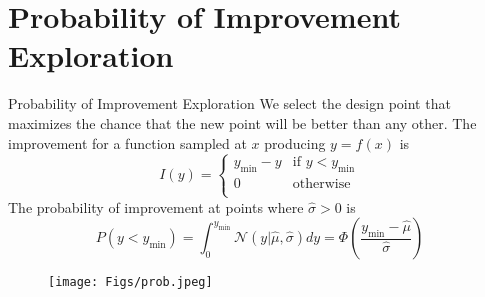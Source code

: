 \documentclass{beamer}
\begin{document}
\section{Probability of Improvement Exploration}
\begin{frame}{Probability of Improvement Exploration}
We select the design point that maximizes the chance that the new point will be better than any other. The improvement for a function sampled at $x$ producing $y=f(x)$ is
\begin{equation*}
    I(y) = 
    \begin{cases}
    y_{\min} - y & \textrm{if~} y<y_{\min}\\
    0 & {\textrm{otherwise}}\\
    \end{cases}
\end{equation*}
The probability of improvement at points where $\hat{\sigma}>0$ is
\begin{equation*}
P(y<y_{\min}) = \int_0^{y_{\min}} \mathcal{N}(y| \hat{\mu}, \hat{\sigma})dy = \Phi(\frac{y_{\min}-\hat{\mu}}{\hat{\sigma}})
\end{equation*}

\begin{figure}
\centering
\texttt{[image: Figs/prob.jpeg]}
\end{figure} 

\end{frame}
\end{document}
